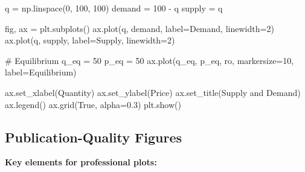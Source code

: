 \documentclass[
  letterpaper,
  DIV=11,
  numbers=noendperiod]{scrartcl}
\newenvironment{Shaded}{\begin{snugshade}}{\end{snugshade}}
\newcommand{\CommentTok}[1]{\textcolor[rgb]{0.37,0.37,0.37}{#1}}
\newcommand{\DecValTok}[1]{\textcolor[rgb]{0.68,0.00,0.00}{#1}}
\newcommand{\FloatTok}[1]{\textcolor[rgb]{0.68,0.00,0.00}{#1}}
\newcommand{\NormalTok}[1]{\textcolor[rgb]{0.00,0.23,0.31}{#1}}
\newcommand{\OperatorTok}[1]{\textcolor[rgb]{0.37,0.37,0.37}{#1}}
\newcommand{\StringTok}[1]{\textcolor[rgb]{0.13,0.47,0.30}{#1}}
\newcommand{\VariableTok}[1]{\textcolor[rgb]{0.07,0.07,0.07}{#1}}
\begin{document}
\begin{Shaded}
\begin{Highlighting}[]
\NormalTok{q }\OperatorTok{=}\NormalTok{ np.linspace(}\DecValTok{0}\NormalTok{, }\DecValTok{100}\NormalTok{, }\DecValTok{100}\NormalTok{)}
\NormalTok{demand }\OperatorTok{=} \DecValTok{100} \OperatorTok{{-}}\NormalTok{ q}
\NormalTok{supply }\OperatorTok{=}\NormalTok{ q}

\NormalTok{fig, ax }\OperatorTok{=}\NormalTok{ plt.subplots()}
\NormalTok{ax.plot(q, demand, label}\OperatorTok{=}\StringTok{\textquotesingle{}Demand\textquotesingle{}}\NormalTok{, linewidth}\OperatorTok{=}\DecValTok{2}\NormalTok{)}
\NormalTok{ax.plot(q, supply, label}\OperatorTok{=}\StringTok{\textquotesingle{}Supply\textquotesingle{}}\NormalTok{, linewidth}\OperatorTok{=}\DecValTok{2}\NormalTok{)}

\CommentTok{\# Equilibrium}
\NormalTok{q\_eq }\OperatorTok{=} \DecValTok{50}
\NormalTok{p\_eq }\OperatorTok{=} \DecValTok{50}
\NormalTok{ax.plot(q\_eq, p\_eq, }\StringTok{\textquotesingle{}ro\textquotesingle{}}\NormalTok{, markersize}\OperatorTok{=}\DecValTok{10}\NormalTok{, label}\OperatorTok{=}\StringTok{\textquotesingle{}Equilibrium\textquotesingle{}}\NormalTok{)}

\NormalTok{ax.set\_xlabel(}\StringTok{\textquotesingle{}Quantity\textquotesingle{}}\NormalTok{)}
\NormalTok{ax.set\_ylabel(}\StringTok{\textquotesingle{}Price\textquotesingle{}}\NormalTok{)}
\NormalTok{ax.set\_title(}\StringTok{\textquotesingle{}Supply and Demand\textquotesingle{}}\NormalTok{)}
\NormalTok{ax.legend()}
\NormalTok{ax.grid(}\VariableTok{True}\NormalTok{, alpha}\OperatorTok{=}\FloatTok{0.3}\NormalTok{)}
\NormalTok{plt.show()}
\end{Highlighting}
\end{Shaded}

\subsection{Publication-Quality
Figures}\label{publication-quality-figures}

\textbf{Key elements for professional plots:}
\end{document}
